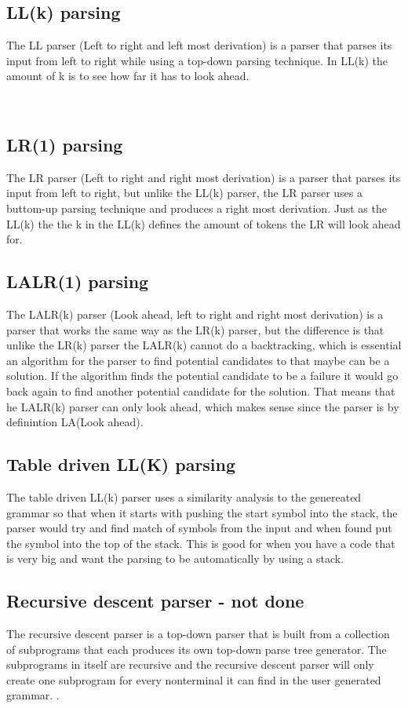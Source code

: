 \subsection*{LL(k) parsing}
The LL parser (Left to right and left most derivation) is a parser that parses its input from left to right while using a top-down parsing technique. In LL(k) the amount of k is to see how far it has to look ahead.\cite{conceptsOfProgrammingLanguages}

\\
\subsection*{LR(1) parsing}
The LR parser (Left to right and right most derivation) is a parser that parses its input from left to right, but unlike the LL(k) parser, the LR parser uses a buttom-up parsing technique and produces a right most derivation. Just as the LL(k) the the k in the LL(k) defines the amount of tokens the LR will look ahead for\cite{LL-LR-Difference}. 
\\
\subsection*{LALR(1) parsing}
The LALR(k) parser (Look ahead, left to right and right most derivation) is a parser that works the same way as the LR(k) parser, but the difference is that unlike the LR(k) parser the LALR(k) cannot do a backtracking, which is essential an algorithm for the parser to find potential candidates to that maybe can be a solution. If the algorithm finds the potential candidate to be a failure it would go back again to find another potential candidate for the solution. That means that he LALR(k) parser can only look ahead, which makes sense since the parser is by definintion LA(Look ahead)\cite{crafting-a-compiler}.

\subsection*{Table driven LL(K) parsing}
The table driven LL(k) parser uses a similarity analysis to the genereated grammar so that when it starts with pushing the start symbol into the stack, the parser would try and find match of symbols from the input and when found put the symbol into the top of the stack\cite{crafting-a-compiler}. This is good for when you have a code that is very big and want the parsing to be automatically by using a stack.

\subsection*{Recursive descent parser - not done} 
The recursive descent parser is a top-down parser that is built from a collection of subprograms that each produces its own top-down parse tree generator. The subprograms in itself are recursive and the recursive descent parser will only create one subprogram for every nonterminal it can find in the user generated grammar. \cite{conceptsOfProgrammingLanguages}. 
